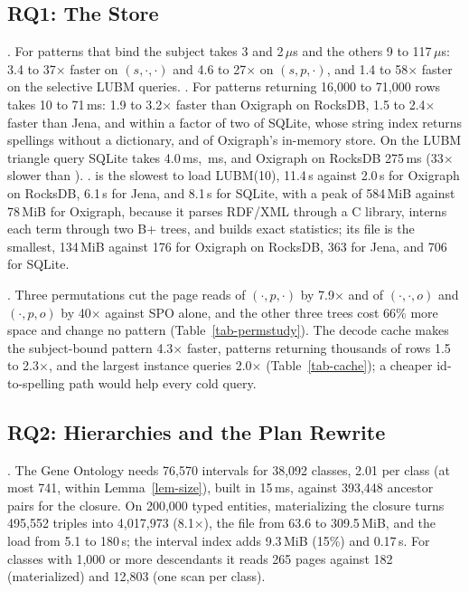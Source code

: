 \subsection{RQ1: The Store}





.
For patterns that bind the subject \sys takes 3 and 2\,$\mu$s and the others 9 to
117\,$\mu$s: 3.4 to 37$\times$ faster on $(s,\cdot,\cdot)$ and 4.6 to 27$\times$ on
$(s,p,\cdot)$, and 1.4 to 58$\times$ faster on the selective LUBM queries.
.
For patterns returning 16,000 to 71,000 rows \sys takes 10 to 71\,ms: 1.9 to
3.2$\times$ faster than Oxigraph on RocksDB, 1.5 to 2.4$\times$ faster than Jena,
and within a factor of two of SQLite, whose string index returns spellings
without a dictionary, and of Oxigraph's in-memory store.
On the LUBM triangle query SQLite takes 4.0\,ms, \,ms, and Oxigraph on
RocksDB 275\,ms (33$\times$ slower than \sys).
.
\sys is the slowest to load LUBM(10), 11.4\,s against 2.0\,s for Oxigraph on
RocksDB, 6.1\,s for Jena, and 8.1\,s for SQLite, with a peak of 584\,MiB against
78\,MiB for Oxigraph, because it parses RDF/XML through a C library, interns each
term through two B+ trees, and builds exact statistics; its file is the smallest,
134\,MiB against 176 for Oxigraph on RocksDB, 363 for Jena, and 706 for SQLite.

.
Three permutations cut the page reads of $(\cdot,p,\cdot)$ by 7.9$\times$ and of
$(\cdot,\cdot,o)$ and $(\cdot,p,o)$ by 40$\times$ against SPO alone, and the other three
trees cost 66\% more space and change no pattern (Table~\ref{tab-permstudy}).
The decode cache makes the subject-bound pattern 4.3$\times$ faster, patterns
returning thousands of rows 1.5 to 2.3$\times$, and the largest instance queries
2.0$\times$ (Table~\ref{tab-cache}); a cheaper id-to-spelling path would help
every cold query.





\subsection{RQ2: Hierarchies and the Plan Rewrite}

.
The Gene Ontology needs 76,570 intervals for 38,092 classes, 2.01 per class (at
most 741, within Lemma~\ref{lem-size}), built in 15\,ms, against 393,448 ancestor
pairs for the closure.
On 200,000 typed entities, materializing the closure turns 495,552 triples into
4,017,973 (8.1$\times$), the file from 63.6 to 309.5\,MiB, and the load from 5.1 to
180\,s; the interval index adds 9.3\,MiB (15\%) and 0.17\,s.
For classes with 1,000 or more descendants it reads 265 pages against 182
(materialized) and 12,803 (one scan per class).

